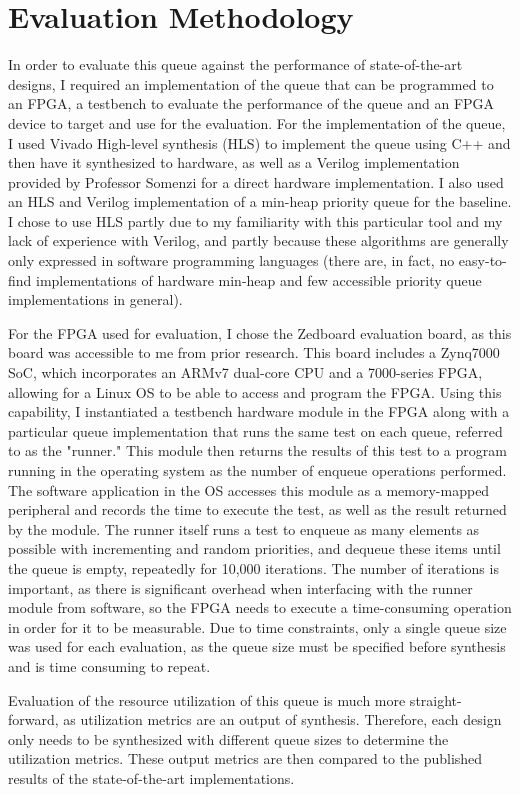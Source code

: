 \section{Evaluation Methodology}
\label{sec:method}

In order to evaluate this queue against the performance of state-of-the-art designs, I required an implementation of the queue that can be programmed to an FPGA, a testbench to evaluate the performance of the queue and an FPGA device to target and use for the evaluation. For the implementation of the queue, I used Vivado High-level synthesis (HLS) to implement the queue using C++ and then have it synthesized to hardware, as well as a Verilog implementation provided by Professor Somenzi for a direct hardware implementation. I also used an HLS and Verilog implementation of a min-heap priority queue for the baseline. I chose to use HLS partly due to my familiarity with this particular tool and my lack of experience with Verilog, and partly because these algorithms are generally only expressed in software programming languages (there are, in fact, no easy-to-find implementations of hardware min-heap and few accessible priority queue implementations in general).

For the FPGA used for evaluation, I chose the Zedboard evaluation board, as this board was accessible to me from prior research. This board includes a Zynq7000 SoC, which incorporates an ARMv7 dual-core CPU and a 7000-series FPGA, allowing for a Linux OS to be able to access and program the FPGA. Using this capability, I instantiated a testbench hardware module in the FPGA along with a particular queue implementation that runs the same test on each queue, referred to as the "runner." This module then returns the results of this test to a program running in the operating system as the number of enqueue operations performed. The software application in the OS accesses this module as a memory-mapped peripheral and records the time to execute the test, as well as the result returned by the module. The runner itself runs a test to enqueue as many elements as possible with incrementing and random priorities, and dequeue these items until the queue is empty, repeatedly for 10,000 iterations. The number of iterations is important, as there is significant overhead when interfacing with the runner module from software, so the FPGA needs to execute a time-consuming operation in order for it to be measurable. Due to time constraints, only a single queue size was used for each evaluation, as the queue size must be specified before synthesis and is time consuming to repeat.

Evaluation of the resource utilization of this queue is much more straight-forward, as utilization metrics are an output of synthesis. Therefore, each design only needs to be synthesized with different queue sizes to determine the utilization metrics. These output metrics are then compared to the published results of the state-of-the-art implementations.